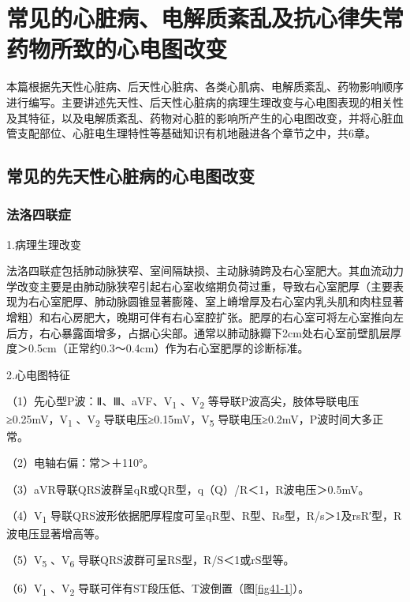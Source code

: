 \part{常见的心脏病、电解质紊乱及抗心律失常药物所致的心电图改变}

本篇根据先天性心脏病、后天性心脏病、各类心肌病、电解质紊乱、药物影响顺序进行编写。主要讲述先天性、后天性心脏病的病理生理改变与心电图表现的相关性及其特征，以及电解质紊乱、药物对心脏的影响所产生的心电图改变，并将心脏血管支配部位、心脏电生理特性等基础知识有机地融进各个章节之中，共6章。

\protect\hypertarget{text00049.html}{}{}

\protect\hypertarget{text00049.htmlux5cux23chapter49}{}{}

\chapter{常见的先天性心脏病的心电图改变}

\protect\hypertarget{text00049.htmlux5cux23subid580}{}{}

\section{法洛四联症}

1.病理生理改变

法洛四联症包括肺动脉狭窄、室间隔缺损、主动脉骑跨及右心室肥大。其血流动力学改变主要是由肺动脉狭窄引起右心室收缩期负荷过重，导致右心室肥厚（主要表现为右心室肥厚、肺动脉圆锥显著膨隆、室上嵴增厚及右心室内乳头肌和肉柱显著增粗）和右心房肥大，晚期可伴有右心室腔扩张。肥厚的右心室可将左心室推向左后方，右心暴露面增多，占据心尖部。通常以肺动脉瓣下2cm处右心室前壁肌层厚度＞0.5cm（正常约0.3～0.4cm）作为右心室肥厚的诊断标准。

2.心电图特征

（1）先心型P波：Ⅱ、Ⅲ、aVF、V\textsubscript{1} 、V\textsubscript{2}
等导联P波高尖，肢体导联电压≥0.25mV，V\textsubscript{1}
、V\textsubscript{2} 导联电压≥0.15mV，V\textsubscript{5}
导联电压≥0.2mV，P波时间大多正常。

（2）电轴右偏：常＞＋110°。

（3）aVR导联QRS波群呈qR或QR型，q（Q）/R＜1，R波电压＞0.5mV。

（4）V\textsubscript{1}
导联QRS波形依据肥厚程度可呈qR型、R型、Rs型，R/s＞1及rsR′型，R波电压显著增高等。

（5）V\textsubscript{5} 、V\textsubscript{6}
导联QRS波群可呈RS型，R/S＜1或rS型等。

（6）V\textsubscript{1} 、V\textsubscript{2}
导联可伴有ST段压低、T波倒置（图\ref{fig41-1}）。

